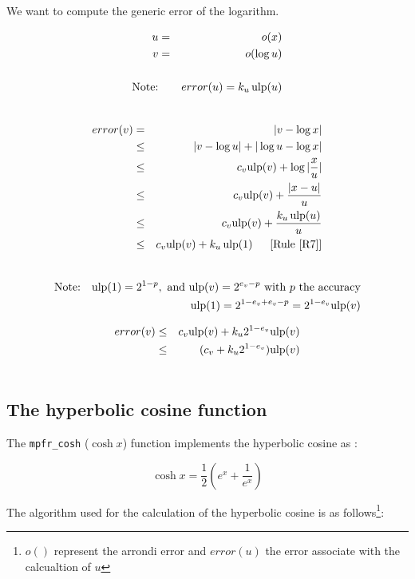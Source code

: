 \documentclass[12pt]{amsart}
\def\n{\textnormal}
\def\ulp{{\rm ulp}}
\newcommand{\U}[1]{\quad \mbox{[Rule~\ref{#1}]}}
\begin{document}
We want to compute the generic error of the logarithm.

\begin{eqnarray}\nonumber
u&=&o(x) \\\nonumber
v&=&o(\log{u}) \\\nonumber
&&\\\nonumber
\textnormal{Note:}&& error(u) = k_u \, \ulp(u)\\\nonumber
\end{eqnarray}

\begin{eqnarray}\nonumber
error(v)& = &|v - \log{x}| \\\nonumber
& \leq &|v - \log{u}| +|\log{u} - \log{x}| \\\nonumber
& \leq & c_v \ulp(v) + \log{|\frac{x}{u}|} \\\nonumber
& \leq & c_v \ulp(v) + \frac{|x-u|}{u} \\\nonumber
& \leq & c_v \ulp(v) + \frac{k_u \, \ulp(u)}{u}\\\nonumber
& \leq & c_v \ulp(v) + k_u \, \ulp(1)\;\; \U{R7}\\\nonumber
\end{eqnarray}


\begin{eqnarray}\nonumber
\textnormal{Note:}&& \ulp(1)=2^{1-p}, \n{ and } \ulp(v)=2^{e_v-p} \n{ with } p \n{ the accuracy} \\\nonumber
&& \ulp(1)= 2^{1-e_v+e_v-p}=2^{1-e_v} \ulp(v)
\end{eqnarray}


\begin{eqnarray}\nonumber
error(v)& \leq & c_v \ulp(v) + k_u 2^{1-e_v} \ulp(v)\\\nonumber
& \leq & (c_v + k_u 2^{1-e_v} )\ulp(v)\\\nonumber
\end{eqnarray}





\subsection{The hyperbolic cosine function}

The {\tt mpfr\_cosh} ($\cosh{x}$) function implements the hyperbolic
cosine as :

$$
\cosh x = \frac{1}{2} \left( e^{x} + \frac{1}{e^x} \right) 
$$

The algorithm used for the calculation of the hyperbolic cosine is as follows\footnote{$o()$ represent the arrondi error and $error(u)$ the
  error associate with the calcualtion of $u$}:
\end{document}

